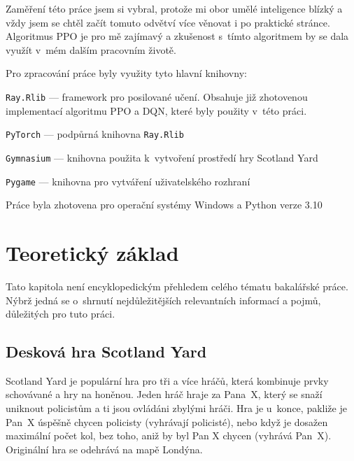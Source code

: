 Zaměření této práce jsem si vybral, protože mi obor umělé inteligence blízký a vždy jsem se chtěl začít tomuto odvětví více věnovat i po praktické stránce.
Algoritmus PPO je pro mě zajímavý a zkušenost s~tímto algoritmem by se dala využít v~mém dalším pracovním životě.\newpage

Pro zpracování práce byly využity tyto hlavní knihovny:
\begin{myitemize}
  \item \texttt{Ray.Rlib} --- framework pro posilované učení.
  Obsahuje již zhotovenou implementací algoritmu PPO a DQN, které byly použity v~této práci.

  \item \texttt{PyTorch} --- podpůrná knihovna \texttt{Ray.Rlib}
  \item \texttt{Gymnasium} --- knihovna použita k~vytvoření prostředí hry Scotland Yard
  \item \texttt{Pygame} --- knihovna pro vytváření uživatelského rozhraní
\end{myitemize}

Práce byla zhotovena pro operační systémy Windows a Python verze 3.10

\chapter{Teoretický základ}
\label{ch:teoreticky_zaklad}
Tato kapitola není encyklopedickým přehledem celého tématu bakalářské práce.
Nýbrž jedná se o~shrnutí nejdůležitějších relevantních informací a pojmů, důležitých pro tuto práci.

\section{Desková hra Scotland Yard}
\label{sec:deskova-hra-scotland-yard}

Scotland Yard je populární hra pro tři a více hráčů, která kombinuje prvky schovávané a hry na honěnou.
Jeden hráč hraje za Pana~X, který se snaží uniknout policistům a ti jsou ovládáni zbylými hráči.
Hra je u~konce, pakliže je Pan~X úspěšně chycen policisty (vyhrávají policisté), nebo když je dosažen maximální počet kol, bez toho, aniž by byl Pan X chycen (vyhrává Pan~X).
Originální hra se odehrává na mapě Londýna.

